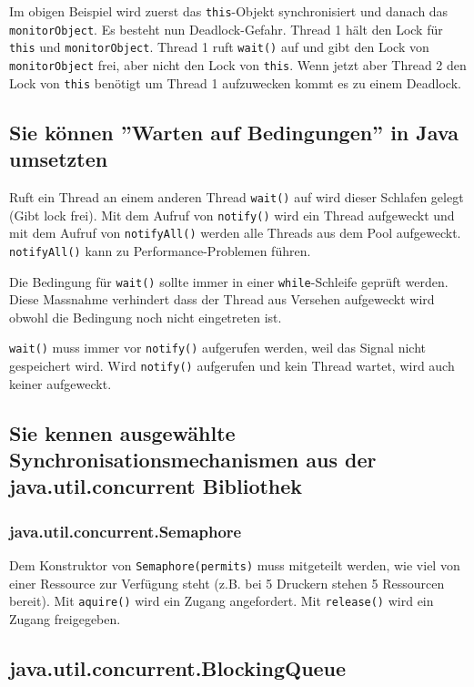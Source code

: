 Im obigen Beispiel wird zuerst das \verb|this|-Objekt synchronisiert und danach das \verb|monitorObject|. Es besteht nun Deadlock-Gefahr. Thread 1 hält den Lock für \verb|this| und \verb|monitorObject|. Thread 1 ruft \verb|wait()| auf und gibt den Lock von \verb|monitorObject| frei, aber nicht den Lock von \verb|this|. Wenn jetzt aber Thread 2 den Lock von \verb|this| benötigt um Thread 1 aufzuwecken kommt es zu einem Deadlock.


\subsection{Sie können ''Warten auf Bedingungen'' in Java umsetzten}

Ruft ein Thread an einem anderen Thread \verb|wait()| auf wird dieser Schlafen gelegt (Gibt lock frei). Mit dem Aufruf von \verb|notify()| wird ein Thread aufgeweckt und mit dem Aufruf von \verb|notifyAll()| werden alle Threads aus dem Pool aufgeweckt. \verb|notifyAll()| kann zu Performance-Problemen führen. 

Die Bedingung für \verb|wait()| sollte immer in einer \verb|while|-Schleife geprüft werden. Diese Massnahme verhindert dass der Thread aus Versehen aufgeweckt wird obwohl die Bedingung noch nicht eingetreten ist. 

\verb|wait()| muss immer vor \verb|notify()| aufgerufen werden, weil das Signal nicht gespeichert wird. Wird \verb|notify()| aufgerufen und kein Thread wartet, wird auch keiner aufgeweckt.

\subsection{Sie kennen ausgewählte Synchronisationsmechanismen aus der java.util.concurrent Bibliothek}

\subsubsection{java.util.concurrent.Semaphore}

Dem Konstruktor von \verb|Semaphore(permits)| muss mitgeteilt werden, wie viel von einer Ressource zur Verfügung steht (z.B. bei 5 Druckern stehen 5 Ressourcen bereit). Mit \verb|aquire()| wird ein Zugang angefordert. Mit \verb|release()| wird ein Zugang freigegeben.

\subsection{java.util.concurrent.BlockingQueue}

